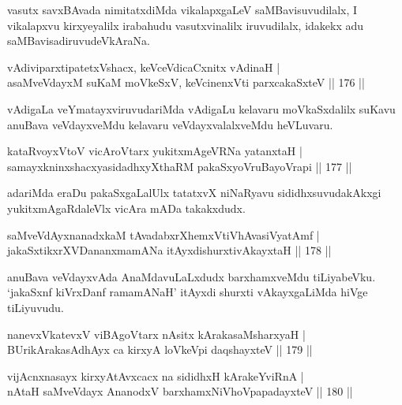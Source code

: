 \begin{artha}%
vasutx savxBAvada nimitatxdiMda vikalapxgaLeV saMBavisuvudilalx, I vikalapxvu kirxyeyalilx irabahudu vasutxvinalilx iruvudilalx, idakekx adu saMBavisadiruvudeVkAraNa.
\end{artha}


\begin{shl}
vAdiviparxtipatetxVshacx, keVceVdicaCxnitx vAdinaH |\\
asaMveVdayxM suKaM moVkeSxV, keVcinenxVti parxcakaSxteV \hfill || 176 ||
\end{shl}

\begin{artha}
vAdigaLa veYmatayxviruvudariMda vAdigaLu kelavaru moVkaSxdalilx suKavu anuBava veVdayxveMdu kelavaru veVdayxvalalxveMdu heVLuvaru.
\end{artha}

\begin{shl}
kataRvoyxV\s toV vicAroV\s tarx yukitxmAgeVRNa yatanxtaH |\\
samayxkninxshacxyasidadhxyXthaRM pakaSxyoVruBayoVrapi \hfill || 177 ||
\end{shl}

\begin{artha}
adariMda eraDu pakaSxgaLalUlx tatatxvX niNaRyavu sididhxsuvudakAkxgi yukitxmAgaRdaleVlx vicAra mADa takakxdudx.
\end{artha}

\begin{shl}
saMveVdAyxnanadxkaM tAvadabxrXhemxVtiVhAvasiVyatAmf |\\
jakaSxtikxrXVDananxmamANa itAyxdishurxtivAkayxtaH \hfill || 178 ||
\end{shl}

\begin{artha}
anuBava veVdayxvAda AnaMdavuLaLxdudx barxhamxveMdu tiLiyabeVku. `jakaSxnf kiVrxDanf ramamANaH' itAyxdi shurxti vAkayxgaLiMda hiVge tiLiyuvudu.
\end{artha}


\begin{shl}
nanevxVkatevxV viBAgoV\s tarx nAsitx kArakasaMsharxyaH |\\
BUrikArakasAdhAyx ca kirxyA loVkeV\s pi daqshayxteV \hfill || 179 ||
\end{shl}

\begin{shl}
vijAcnxnasayx kirxyAtAvxcacx na sididhxH kArakeYviRnA |\\
nAtaH saMveVdayx AnanodxV barxhamxNiVhoVpapadayxteV \hfill || 180 ||
\end{shl}

